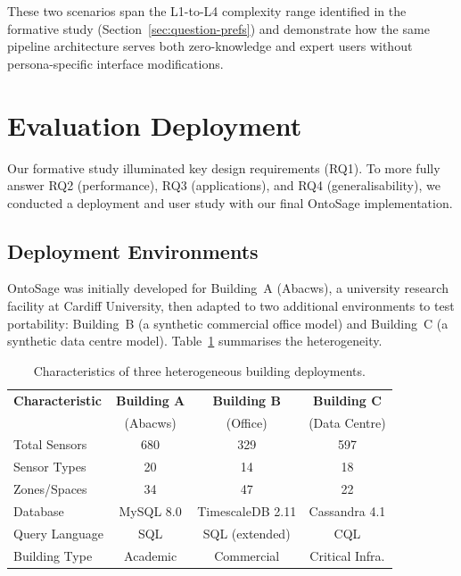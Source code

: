 \documentclass[acmsmall]{acmart}
\begin{document}
These two scenarios span the L1-to-L4 complexity range identified in the formative study (Section~\ref{sec:question-prefs}) and demonstrate how the same pipeline architecture serves both zero-knowledge and expert users without persona-specific interface modifications.


\section{Evaluation Deployment}
\label{sec:deployment}

Our formative study illuminated key design requirements (RQ1). To more fully answer RQ2 (performance), RQ3 (applications), and RQ4 (generalisability), we conducted a deployment and user study with our final OntoSage implementation.

\subsection{Deployment Environments}

OntoSage was initially developed for Building~A (Abacws), a university research facility at Cardiff University, then adapted to two additional environments to test portability: Building~B (a synthetic commercial office model) and Building~C (a synthetic data centre model). Table~\ref{tab:building-characteristics} summarises the heterogeneity.

\begin{table}[t]
\centering
\caption{Characteristics of three heterogeneous building deployments.}
\label{tab:building-characteristics}
\small
\begin{tabular}{@{}lccc@{}}
\toprule
\textbf{Characteristic} & \textbf{Building A} & \textbf{Building B} & \textbf{Building C} \\
 & (Abacws) & (Office) & (Data Centre) \\
\midrule
Total Sensors   & 680 & 329 & 597 \\
Sensor Types    &  20 &  14 &  18 \\
Zones/Spaces    &  34 &  47 &  22 \\
Database        & MySQL 8.0 & TimescaleDB 2.11 & Cassandra 4.1 \\
Query Language  & SQL & SQL (extended) & CQL \\
Building Type   & Academic & Commercial & Critical Infra. \\
\bottomrule
\end{tabular}
\end{table}
\end{document}
